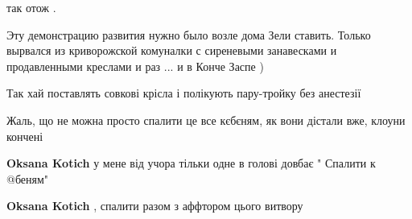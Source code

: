 \begin{itemize}
\begin{itemize}
так отож .

 
Эту демонстрацию развития нужно было возле дома Зели ставить. Только вырвался из криворожской комуналки с сиреневыми занавесками и продавленными креслами и раз ... и в Конче Заспе )

 
Так хай поставлять совкові крісла і полікують пару-тройку без анестезії
\end{itemize}

 
Жаль, що не можна просто спалити це все кєбєням, як вони дістали вже, клоуни
кончені

\begin{itemize}
 
\textbf{Oksana Kotich} у мене від учора тільки одне в голові довбає " Спалити к @беням"

 
\textbf{Oksana Kotich} , спалити разом з аффтором цього витвору

 

\end{itemize}
\end{itemize}
